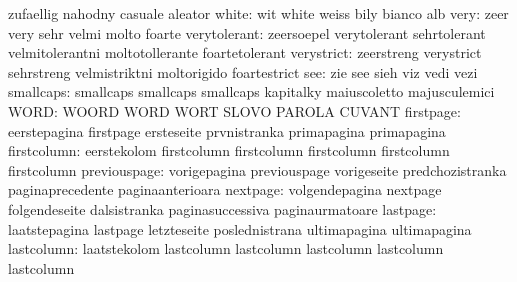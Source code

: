                            zufaellig                 nahodny
                           casuale                   aleator
                    white: wit                       white
                           weiss                     bily
                           bianco                    alb
                     very: zeer                      very
                           sehr                      velmi
                           molto                     foarte
             verytolerant: zeersoepel                verytolerant
                           sehrtolerant              velmitolerantni
                           moltotollerante           foartetolerant
               verystrict: zeerstreng                verystrict
                           sehrstreng                velmistriktni
                           moltorigido               foartestrict %
                      see: zie                       see
                           sieh                      viz
                           vedi                      vezi
                smallcaps: smallcaps                 smallcaps
                           smallcaps                 kapitalky
                           maiuscoletto              majusculemici
                     WORD: WOORD                     WORD
                           WORT                      SLOVO
                           PAROLA                    CUVANT
                firstpage: eerstepagina              firstpage
                           ersteseite                prvnistranka
                           primapagina               primapagina
              firstcolumn: eerstekolom               firstcolumn
                           firstcolumn               firstcolumn
                           firstcolumn               firstcolumn
             previouspage: vorigepagina              previouspage
                           vorigeseite               predchozistranka
                           paginaprecedente          paginaanterioara
                 nextpage: volgendepagina            nextpage
                           folgendeseite             dalsistranka
                           paginasuccessiva          paginaurmatoare
                 lastpage: laatstepagina             lastpage
                           letzteseite               poslednistrana
                           ultimapagina              ultimapagina
               lastcolumn: laatstekolom              lastcolumn
                           lastcolumn                lastcolumn
                           lastcolumn                lastcolumn
